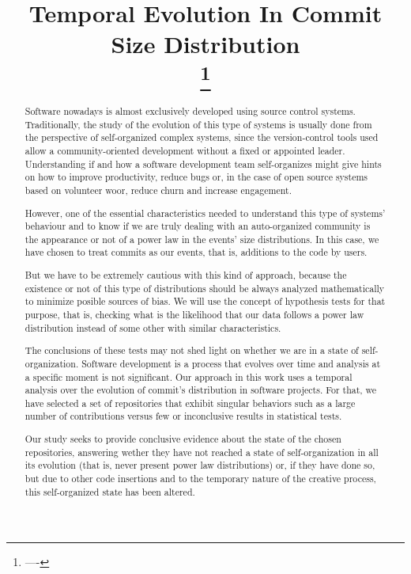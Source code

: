 \documentclass[conference]{IEEEtran}
\begin{document}
\title{Temporal Evolution In Commit Size Distribution\\
	\thanks{----}
}

\author{\IEEEauthorblockN{-}
	\IEEEauthorblockA{-}
	\and
	\IEEEauthorblockN{-}
	\IEEEauthorblockA{-}
}

\maketitle

\begin{abstract}
  Software nowadays is almost exclusively developed using source
  control systems. Traditionally, the study of the evolution of this
  type of systems is usually done from the perspective of
  self-organized complex systems, since the version-control tools used
  allow a community-oriented development without a fixed or appointed
  leader. Understanding if and how a software development team
  self-organizes might give hints on how to improve productivity,
  reduce bugs or, in the case of open source systems based on
  volunteer woor, reduce churn and increase engagement.

  However, one of the essential characteristics needed to understand
  this type of systems' behaviour and to know if we are truly dealing
  with an auto-organized community is the appearance or not of a power
  law in the events' size distributions.  In this case, we have chosen
  to treat commits as our events, that is, additions to the code by
  users.

  But we have to be extremely cautious with this kind of approach,
  because the existence or not of this type of distributions should be
  always analyzed mathematically to minimize posible sources of bias.
  We will use the concept of hypothesis tests for that purpose, that
  is, checking what is the likelihood that our data follows a power
  law distribution instead of some other with similar characteristics.

  The conclusions of these tests may not shed light on whether we are
  in a state of self-organization.  Software development is a process
  that evolves over time and analysis at a specific moment is not
  significant.  Our approach in this work uses a temporal analysis
  over the evolution of commit's distribution in software
  projects. For that, we have selected a set of repositories that
  exhibit singular behaviors such as a large number of contributions
  versus few or inconclusive results in statistical tests.

  Our study seeks to provide conclusive evidence about the state of
  the chosen repositories, answering wether they have not reached a
  state of self-organization in all its evolution (that is, never
  present power law distributions) or, if they have done so, but due
  to other code insertions and to the temporary nature of the creative
  process, this self-organized state has been altered.

  

\end{abstract}
\end{document}
